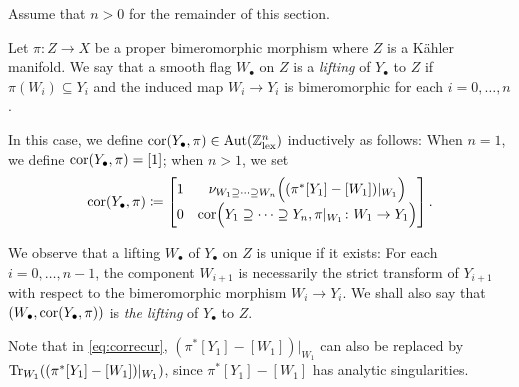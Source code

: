Assume that $n>0$ for the remainder of this section.
\begin{definition}\label{def:lifting}
    Let $\pi\colon Z\rightarrow X$ be a proper bimeromorphic morphism where $Z$ is a Kähler manifold. We say that a smooth flag $W_{\bullet}$ on $Z$ is a \emph{lifting} of $Y_{\bullet}$ to $Z$ if $\pi(W_i)\subseteq Y_i$ and the induced map $W_i\to Y_i$ is bimeromorphic for each $i=0,\ldots,n$.

    In this case, we define $\operatorname{cor}(Y_{\bullet},\pi)\in \operatorname{Aut}(\mathbb{Z}^n_{\mathrm{lex}})$ inductively as follows: When $n=1$, we define $\operatorname{cor}(Y_{\bullet},\pi)=[1]$; when $n>1$, we set
    \begin{equation}\label{eq:correcur}
    \operatorname{cor}(Y_{\bullet},\pi)\coloneqq
    \begin{bmatrix}
    1 & \nu_{W_1\supseteq \cdots \supseteq W_n}\Bigl((\pi^*[Y_1]-[W_1])|_{W_1}\Bigr)\\
    0 & \operatorname{cor}\Bigl(Y_1\supseteq \cdots \supseteq Y_n,\pi|_{W_1}\colon W_1\rightarrow Y_1\Bigr)
    \end{bmatrix}.
    \end{equation}
\end{definition}
We observe that a lifting $W_{\bullet}$ of $Y_{\bullet}$ on $Z$ is unique if it exists: For each $i=0,\ldots,n-1$, the component $W_{i+1}$ is necessarily the strict transform of $Y_{i+1}$ with respect to the bimeromorphic morphism $W_i\rightarrow Y_i$. We shall also say that
$(W_{\bullet},\operatorname{cor}(Y_{\bullet},\pi))$ is \emph{the lifting} of $Y_{\bullet}$ to $Z$.

Note that in \eqref{eq:correcur}, $(\pi^*[Y_1]-[W_1])|_{W_1}$ can also be replaced by $\operatorname{Tr}_{W_1}((\pi^*[Y_1]-[W_1])|_{W_1})$, since $\pi^*[Y_1]-[W_1]$ has analytic singularities.


